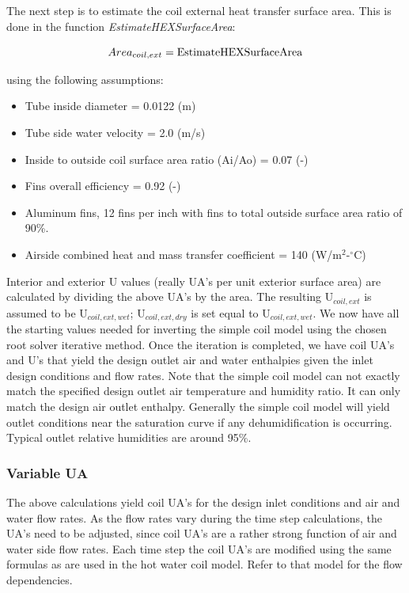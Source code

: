 The next step is to estimate the coil external heat transfer surface area. This is done in the function \emph{EstimateHEXSurfaceArea}:

\begin{equation}
Are{a_{coil,ext}} = {\rm{EstimateHEXSurfaceArea}}
\end{equation}

using the following assumptions:

\begin{itemize}
\item
  Tube inside diameter = 0.0122 (m)
\item
  Tube side water velocity = 2.0 (m/s)
\item
  Inside to outside coil surface area ratio (Ai/Ao) = 0.07 (-)
\item
  Fins overall efficiency = 0.92 (-)
\item
  Aluminum fins, 12 fins per inch with fins to total outside surface area ratio of 90\%.
\item
  Airside combined heat and mass transfer coefficient = 140 (W/m\(^2\)-\(^{\circ}\)C)
\end{itemize}

Interior and exterior U values (really UA's per unit exterior surface area) are calculated by dividing the above UA's by the area. The resulting U\(_{coil,ext}\) is assumed to be U\(_{coil,ext,wet}\); U\(_{coil,ext,dry}\) is set equal to U\(_{coil,ext,wet}\). We now have all the starting values needed for inverting the simple coil model using the chosen root solver iterative method. Once the iteration is completed, we have coil UA's and U's that yield the design outlet air and water enthalpies given the inlet design conditions and flow rates. Note that the simple coil model can not exactly match the specified design outlet air temperature and humidity ratio. It can only match the design air outlet enthalpy. Generally the simple coil model will yield outlet conditions near the saturation curve if any dehumidification is occurring. Typical outlet relative humidities are around 95\%.

\subsubsection{Variable UA}\label{variable-ua}

The above calculations yield coil UA's for the design inlet conditions and air and water flow rates. As the flow rates vary during the time step calculations, the UA's need to be adjusted, since coil UA's are a rather strong function of air and water side flow rates. Each time step the coil UA's are modified using the same formulas as are used in the hot water coil model. Refer to that model for the flow dependencies.

